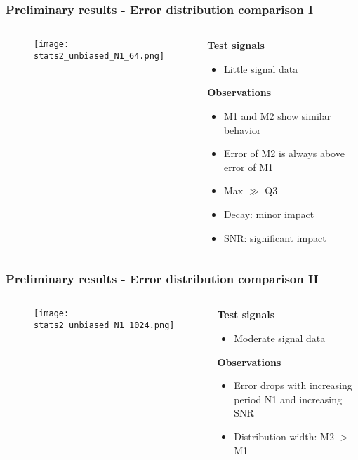 \documentclass[11pt,aspectratio=169]{beamer}
\begin{document}
	\begin{frame}
		\frametitle{Preliminary results - Error distribution comparison I}
		\begin{columns}[t]
			\begin{RIPcolleft}
				\begin{figure}
					\texttt{[image: stats2\_unbiased\_N1\_64.png]}
				\end{figure}
			\end{RIPcolleft}
			\begin{RIPcolright}
				\textbf{Test signals}\\
				\begin{itemize}
					\item Little signal data
				\end{itemize}
				\textbf{Observations}\\
				\begin{itemize}
					\item M1 and M2 show similar behavior
					\item Error of M2 is always above error of M1
					\item Max $\gg$ Q3
					\item Decay: minor impact
					\item SNR: significant impact
				\end{itemize}
			\end{RIPcolright}
		\end{columns}
	\end{frame}
	\begin{frame}
		\frametitle{Preliminary results - Error distribution comparison II}
		\begin{columns}[t]
			\begin{RIPcolleft}
				\begin{figure}
					\texttt{[image: stats2\_unbiased\_N1\_1024.png]}
				\end{figure}
			\end{RIPcolleft}
			\begin{RIPcolright}
				\textbf{Test signals}\\
				\begin{itemize}
					\item Moderate signal data
				\end{itemize}
				\textbf{Observations}\\
				\begin{itemize}
					\item Error drops with increasing period N1 and increasing SNR
					\item Distribution width: \hfill{} M2 $>$ M1
				\end{itemize}
			\end{RIPcolright}
		\end{columns}
	\end{frame}
\end{document}
